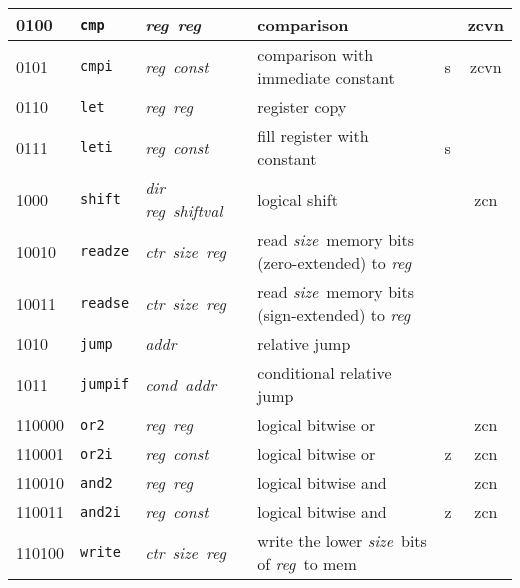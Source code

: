 \documentclass[architecture]{compas2018}
\newcommand{\reg}{\textit{reg}}
\newcommand{\const}{\textit{const}}
\newcommand{\shiftval}{\textit{shiftval}}
\newcommand{\cond}{\textit{cond}}
\newcommand{\ctr}{\textit{ctr}}
\newcommand{\size}{\textit{size}}
\newcommand{\addr}{\textit{addr}}
\begin{document}
\begin{table}[!h]
\begin{center}
\begin{tabular}{|l|l|l|l|l|c|}
    \hline
    0100    & \texttt{cmp}    & \reg\ \reg\                   & comparison                                           &      & zcvn        \\
    \hline
    0101    & \texttt{cmpi}   & \reg\ \const\                 & comparison with immediate constant                   & s    & zcvn        \\
    \hline
    0110    & \texttt{let}    & \reg\ \reg\                   & register copy                                        &      &             \\
    \hline
    0111    & \texttt{leti}   & \reg\ \const\                 & fill register with constant                          & s    &             \\
    \hline
    1000    & \texttt{shift}  & \textit{dir} \reg\ \shiftval\ & logical shift                                        &      & zcn         \\
    \hline
    10010   & \texttt{readze} & \ctr\ \size\ \reg\            & read \size\ memory bits (zero-extended) to \reg\     &      &             \\
    10011   & \texttt{readse} & \ctr\ \size\ \reg\            & read \size\ memory bits (sign-extended) to \reg\     &      &             \\
    \hline
    1010    & \texttt{jump}   & \addr\                        & relative jump                                        &      &             \\
    \hline
    1011    & \texttt{jumpif} & \cond\ \addr\                 & conditional relative jump                            &      &             \\
    \hline
    110000  & \texttt{or2}    & \reg\ \reg\                   & logical bitwise or                                   &      & zcn         \\
    \hline
    110001  & \texttt{or2i}   & \reg\ \const\                 & logical bitwise or                                   & {z}  & zcn         \\
    \hline
    110010  & \texttt{and2}   & \reg\ \reg\                   & logical bitwise and                                  &      & zcn         \\
    \hline
    110011  & \texttt{and2i}  & \reg\ \const\                 & logical bitwise and                                  & {z}  & zcn         \\
    \hline
    110100  & \texttt{write}  & \ctr\ \size\ \reg\            & write the lower \size\ bits of \reg\ to mem          &      &             \\

\end{tabular}
\end{center}
\end{table}
\end{document}
